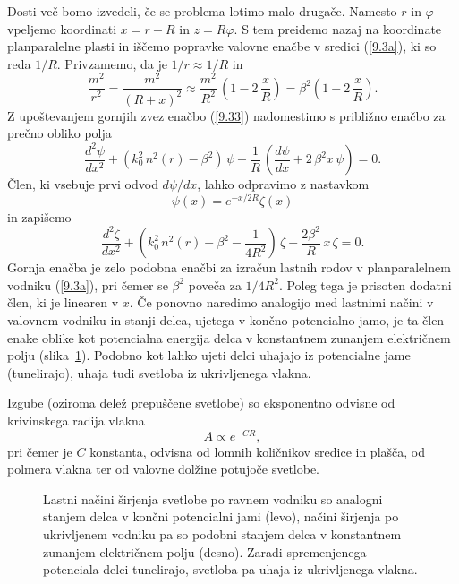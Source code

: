 Dosti več bomo izvedeli, če se problema lotimo malo drugače. Namesto $r$
in $\varphi$ vpeljemo koordinati $x=r-R$ in $z=R\varphi$.
S tem preidemo nazaj na koordinate planparalelne plasti in iščemo popravke valovne
enačbe v sredici (\ref{9.3a}), ki so reda $1/R.$ Privzamemo, da je $1/r\approx1/R$ in 
\begin{equation}
\frac{m^{2}}{r^{2}}=\frac{m^{2}}{\left(R+x\right)^{2}}\approx\frac{m^{2}}
{R^{2}}\,\left(1-2\,\frac{x}{R}\right)=\beta^{2}\left(1-2\,\frac{x}{R}\right).
\label{9.34}
\end{equation}
Z upoštevanjem gornjih zvez enačbo (\ref{9.33}) nadomestimo s približno enačbo za prečno obliko
polja 
\begin{equation}
\frac{d^{2}\psi}{dx^{2}}+\left(k_{0}^{2}\, n^{2}\left(r\right)-\beta^{2}\right)\,\psi+\frac{1}{R}\,
\left(\frac{d\psi}{dx}+2\,\beta^{2}x\,\psi\right)=0.
\label{9.35}
\end{equation}
Člen, ki vsebuje prvi odvod $d \psi/d x$, lahko odpravimo z nastavkom 
\begin{equation}
\psi(x) = e^{-x/2R} \zeta(x)
\end{equation}
in zapišemo
\begin{equation}
\frac{d^{2}\zeta}{dx^{2}}+\left(k_{0}^{2}\, n^{2}\left(r\right)-\beta^{2}-\frac{1}{4R^2}\right)\,\zeta
+ \frac{2\beta^{2}}{R}\,x\,\zeta=0.
\label{9.35a}
\end{equation}
Gornja enačba je zelo podobna enačbi za izračun lastnih rodov v planparalelnem
vodniku (\ref{9.3a}), pri čemer se $\beta^2$ poveča za $1/4R^2$. Poleg tega je prisoten
dodatni člen, ki je linearen v $x$. Če ponovno naredimo analogijo
med lastnimi načini v valovnem vodniku in stanji delca, ujetega v končno potencialno jamo, 
je ta člen enake oblike kot potencialna energija delca v konstantnem zunanjem električnem 
polju (slika~\ref{fig:tunel}). Podobno kot lahko ujeti delci uhajajo iz potencialne jame
(tunelirajo), uhaja tudi svetloba iz ukrivljenega vlakna.

Izgube (oziroma delež prepuščene 
svetlobe) so eksponentno odvisne od krivinskega radija vlakna 
\begin{equation}
A \propto e^{-CR},
\end{equation}
pri čemer je $C$ konstanta, odvisna od lomnih količnikov sredice in plašča, od polmera vlakna 
ter od valovne dolžine potujoče svetlobe.
\begin{figure}[h]
\centering
\def\svgwidth{120truemm} 
 
\caption{Lastni načini širjenja svetlobe po ravnem vodniku so analogni stanjem 
delca v končni potencialni jami (levo), načini širjenja po ukrivljenem vodniku pa 
so podobni stanjem delca v konstantnem zunanjem električnem polju (desno). Zaradi
spremenjenega potenciala delci tunelirajo, svetloba pa uhaja iz ukrivljenega vlakna.}
\label{fig:tunel}
\end{figure}

